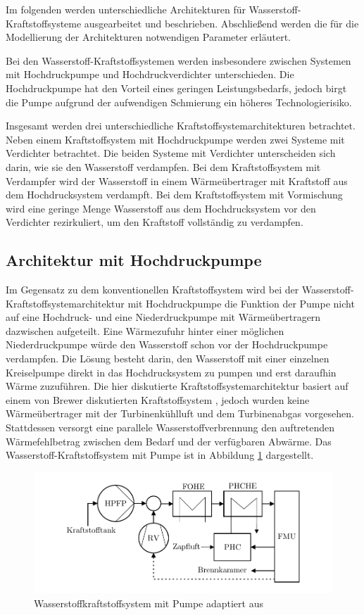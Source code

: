 Im folgenden werden unterschiedliche Architekturen für Wasserstoff-Kraftstoffsysteme ausgearbeitet und beschrieben. Abschließend werden die für die Modellierung der Architekturen notwendigen Parameter erläutert. 

Bei den Wasserstoff-Kraftstoffsystemen werden insbesondere zwischen Systemen mit Hochdruckpumpe und Hochdruckverdichter unterschieden. Die Hochdruckpumpe hat den Vorteil eines geringen Leistungsbedarfs, jedoch birgt die Pumpe aufgrund der aufwendigen Schmierung ein höheres Technologierisiko. 

Insgesamt werden drei unterschiedliche Kraftstoffsystemarchitekturen betrachtet. Neben einem Kraftstoffsystem mit Hochdruckpumpe werden zwei Systeme mit Verdichter betrachtet. Die beiden Systeme mit Verdichter unterscheiden sich darin, wie sie den Wasserstoff verdampfen. Bei dem Kraftstoffsystem mit Verdampfer wird der Wasserstoff in einem Wärmeübertrager mit Kraftstoff aus dem Hochdrucksystem verdampft. Bei dem Kraftstoffsystem mit Vormischung wird eine geringe Menge Wasserstoff aus dem Hochdrucksystem vor den Verdichter rezirkuliert, um den Kraftstoff vollständig zu verdampfen.

\subsection{Architektur mit Hochdruckpumpe}

Im Gegensatz zu dem konventionellen Kraftstoffsystem wird bei der Wasserstoff-Kraftstoffsystemarchitektur mit Hochdruckpumpe die Funktion der Pumpe nicht auf eine Hochdruck- und eine Niederdruckpumpe mit Wärmeübertragern dazwischen aufgeteilt. Eine Wärmezufuhr hinter einer möglichen Niederdruckpumpe würde den Wasserstoff schon vor der Hochdruckpumpe verdampfen. Die Lösung besteht darin, den Wasserstoff mit einer einzelnen Kreiselpumpe direkt in das Hochdrucksystem zu pumpen und erst daraufhin Wärme zuzuführen. Die hier diskutierte Kraftstoffsystemarchitektur basiert auf einem von Brewer diskutierten Kraftstoffsystem \cite{Brewer.1991}, jedoch wurden keine Wärmeübertrager mit der Turbinenkühlluft und dem Turbinenabgas vorgesehen. Stattdessen versorgt eine parallele Wasserstoffverbrennung den auftretenden Wärmefehlbetrag zwischen dem Bedarf und der verfügbaren Abwärme. Das Wasserstoff-Kraftstoffsystem mit Pumpe ist in  Abbildung \ref{fig:pumpe} dargestellt.

\begin{figure}[ht]
\centering
\includegraphics[width=1\linewidth]{4_Abbildungen/2_Hauptteil/Kraftstoffsystem Abbildungen/pump.pdf}
  \caption{Wasserstoffkraftstoffsystem mit Pumpe adaptiert aus \cite{Brewer.1991}}
  \label{fig:pumpe}
\end{figure}
\FloatBarrier 


